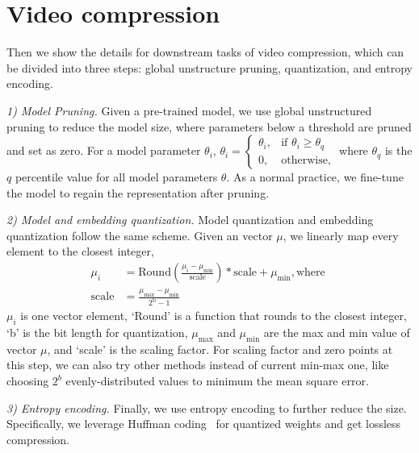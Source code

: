 \documentclass[10pt,twocolumn,letterpaper]{article}
\begin{document}
\section{Video compression}
Then we show the details for downstream tasks of video compression, which can be divided into three steps: global unstructure pruning, quantization, and entropy encoding.

\textit{1) Model Pruning.}
Given a pre-trained model, we use global unstructured pruning to reduce the model size, where parameters below a threshold are pruned and set as zero.
For a model parameter $\theta_i$,
$
    \theta_i = 
    \begin{cases}
    \theta_i, & \text{if } \theta_i \geq \theta_q\\
    0,              & \text{otherwise,}
    \end{cases}
$    
where $\theta_q$ is the $q$ percentile value for all model parameters $\theta$. As a normal practice, we fine-tune the model to regain the representation after pruning.

\textit{2) Model and embedding quantization.}
Model quantization and embedding quantization follow the same scheme.
Given an vector $\mu$, we linearly map every element to the closest integer,
\begin{equation}
  \begin{aligned}
    \mu_i &= \text{Round}\left(\frac{\mu_i - \mu_\text{min}}{\text{scale}}\right) * \text{scale} + \mu_\text{min} ,
    \text{where } \\
    \text{scale} &= \frac{\mu_\text{max} - \mu_\text{min}}{2^\text{b} - 1}
    \label{equa:quant}
  \end{aligned}
\end{equation}
$\mu_{i}$ is one vector element, `Round' is a function that rounds to the closest integer, `b' is the bit length for quantization, $\mu_\text{max}$ and $\mu_\text{min}$ are the max and min value of vector $\mu$, and `scale' is the scaling factor.
For scaling factor and zero points at this step, we can also try other methods instead of current min-max one, like choosing $2^b$ evenly-distributed values to minimum the mean square error.

\textit{3) Entropy encoding.}
Finally, we use entropy encoding to further reduce the size.
Specifically, we leverage Huffman coding~\cite{huffman1952method} for quantized weights and get lossless compression.
\end{document}
